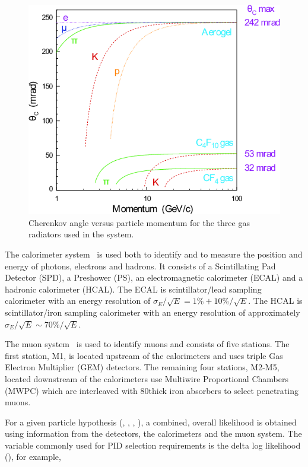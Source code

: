 \begin{figure}[!tb]
\centering
\includegraphics[height=0.3\textheight]{figs/detector/radiators.png}
\caption{Cherenkov angle versus particle momentum for the three gas radiators used in the \rich system.}
\label{fig:radiators}
\end{figure}

The calorimeter system~\cite{LHCb-TDR-002} is used both to identify and to measure the position and energy of photons, electrons and hadrons. It consists of a Scintillating Pad Detector (SPD), a Preshower (PS), an electromagnetic calorimeter (ECAL) and a hadronic calorimeter (HCAL). The ECAL is scintillator/lead sampling calorimeter with an energy resolution of $\sigma_{E}/\sqrt{E} = 1\% + 10\%/\sqrt{E}$. The HCAL is scintillator/iron sampling calorimeter with an energy resolution of approximately $\sigma_{E}/\sqrt{E} \sim 70\%/\sqrt{E}$. 

The muon system~\cite{LHCb-TDR-004,muon-tdr2,muon-tdr3,LHCb-DP-2012-002} is used to identify muons and consists of five stations. The first station, M1, is located upstream of the calorimeters and uses triple Gas Electron Multiplier (GEM) detectors. The remaining four stations, M2-M5, located downstream of the calorimeters use Multiwire Proportional Chambers (MWPC) which are interleaved with 80\cm thick iron absorbers to select penetrating muons.

For a given particle hypothesis (\kaon, \pion, \muon, \proton), a combined, overall likelihood is obtained using information from the \rich detectors, the calorimeters and the muon system. The variable commonly used for PID selection requirements is the delta log likelihood (\dll), for example,

